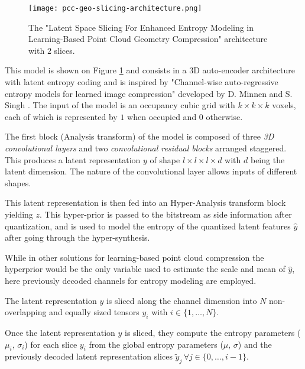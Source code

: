 \begin{figure}
    \centering
    \texttt{[image: pcc-geo-slicing-architecture.png]}
    \caption{The "Latent Space Slicing For Enhanced Entropy Modeling in Learning-Based Point Cloud Geometry Compression" architecture with $2$ slices.}
    \label{fig:pcc-geo-slicing-architecture}
\end{figure}

This model is shown on Figure \ref{fig:pcc-geo-slicing-architecture} and consists in a 3D auto-encoder architecture with latent entropy coding and is inspired by "Channel-wise auto-regressive entropy models for learned image compression" developed by D. Minnen and S. Singh \cite{bib:2d-pcc-slicing}. 
The input of the model is an occupancy cubic grid with $k \times k \times k$ voxels, each of which is represented by $1$ when occupied and $0$ otherwise. 


The first block (Analysis transform) of the model is composed of three \textit{3D convolutional layers} and two \textit{convolutional residual blocks} arranged staggered. This produces a latent representation $y$ of shape $l \times l \times l \times d$ with $d$ being the latent dimension. The nature of the convolutional layer allows inputs of different shapes. 

This latent representation is then fed into an Hyper-Analysis transform block yielding $z$. This hyper-prior is passed to the bitstream as side information after quantization, and is used to model the entropy of the quantized latent features $\hat{y}$ after going through the hyper-synthesis. 

While in other solutions for learning-based point cloud compression the hyperprior would be the only variable used to estimate the scale and mean of $\hat{y}$, here previously decoded channels for entropy modeling are employed.

The latent representation $y$ is sliced along the channel dimension into $N$ non-overlapping and equally sized tensors $y_i$ with $i \in \{1, \dots, N\}$. 

Once the latent representation $y$ is sliced, they compute the entropy parameters ($\mu_i,\,\sigma_i$) for each slice $y_i$ from the global entropy parameters ($\mu,\,\sigma$) and the previously decoded latent representation slices $\tilde{y}_j\,\forall j \in \{0,\dots,i-1\}$. 

